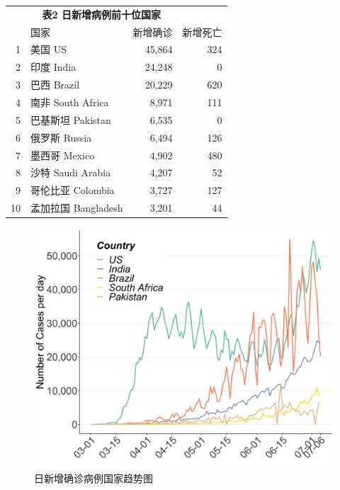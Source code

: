 \documentclass[
]{article}
\begin{document}
\begin{table}[H]
    \centering \begin{table}[H]
\centering\begingroup\fontsize{20}{22}\selectfont

\begin{tabular}{rlrr}
\toprule
\multicolumn{0}{c}{\textbf{ }} & \multicolumn{2}{c}{\textbf{表2 日新增病例前十位国家}} \\
  & 国家 & 新增确诊 & 新增死亡\\
\midrule
\rowcolor{gray!6}  1 & 美国 US & 45,864 & 324\\
2 & 印度 India & 24,248 & 0\\
\rowcolor{gray!6}  3 & 巴西 Brazil & 20,229 & 620\\
4 & 南非 South Africa & 8,971 & 111\\
\rowcolor{gray!6}  5 & 巴基斯坦 Pakistan & 6,535 & 0\\
6 & 俄罗斯 Russia & 6,494 & 126\\
\rowcolor{gray!6}  7 & 墨西哥 Mexico & 4,902 & 480\\
8 & 沙特 Saudi Arabia & 4,207 & 52\\
\rowcolor{gray!6}  9 & 哥伦比亚 Colombia & 3,727 & 127\\
10 & 孟加拉国 Bangladesh & 3,201 & 44\\
\bottomrule
\end{tabular}
\endgroup{}
\end{table} \end{table}
\vspace{5mm}
\begin{figure}[H]
\centering
{}
\caption{日新增确诊病例国家趋势图}
\includegraphics[]{./input/covid2.png}
\end{figure}
\end{document}

